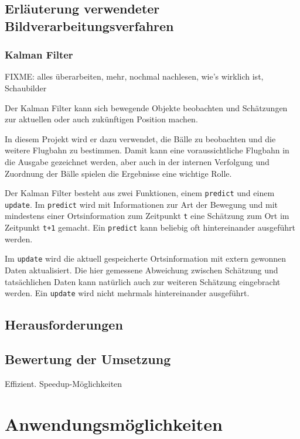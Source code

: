 \documentclass[12pt,a4paper,ngerman]{scrartcl}
\begin{document}
\subsection{Erläuterung verwendeter Bildverarbeitungsverfahren}

\subsubsection{Kalman Filter}

{\color{red} FIXME: alles überarbeiten, mehr, nochmal nachlesen, wie's wirklich ist, Schaubilder}

Der Kalman Filter kann sich bewegende Objekte beobachten und Schätzungen zur aktuellen oder auch zukünftigen Position machen.

In diesem Projekt wird er dazu verwendet, die Bälle zu beobachten und die weitere Flugbahn zu bestimmen. Damit kann eine voraussichtliche Flugbahn in die Ausgabe gezeichnet werden, aber auch in der internen Verfolgung und Zuordnung der Bälle spielen die Ergebnisse eine wichtige Rolle.

Der Kalman Filter besteht aus zwei Funktionen, einem {\tt predict} und einem {\tt update}. Im {\tt predict} wird mit Informationen zur Art der Bewegung und mit mindestens einer Ortsinformation zum Zeitpunkt {\tt t} eine Schätzung zum Ort im Zeitpunkt {\tt t+1} gemacht. Ein {\tt predict} kann beliebig oft hintereinander ausgeführt werden.

Im {\tt update} wird die aktuell gespeicherte Ortsinformation mit extern gewonnen Daten aktualisiert. Die hier gemessene Abweichung zwischen Schätzung und tatsächlichen Daten kann natürlich auch zur weiteren Schätzung eingebracht werden. Ein {\tt update} wird nicht mehrmals hintereinander ausgeführt.

\subsection{Herausforderungen}

\subsection{Bewertung der Umsetzung}

Effizient. Speedup-Möglichkeiten

\section{Anwendungsmöglichkeiten}
\end{document}
